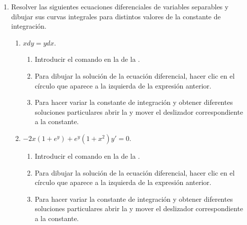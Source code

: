 \begin{enumerate}[leftmargin=*]
\item Resolver las siguientes ecuaciones diferenciales de variables separables y dibujar sus curvas integrales para distintos valores de la constante de integración.
      \begin{enumerate}
      \item $xdy=ydx$.
            \begin{indication}
            \begin{enumerate}
            \item Introducir el comando  en la  de la .
            \item Para dibujar la solución de la ecuación diferencial, hacer clic en el círculo que aparece a la izquierda de la expresión anterior.
            \item Para hacer variar la constante de integración y obtener diferentes soluciones particulares abrir la  y mover el deslizador correspondiente a la constante.
            \end{enumerate}
            \end{indication}

      \item $-2x(1+e^y)+e^y(1+x^{2})y'=0$.
            \begin{indication}
            \begin{enumerate}
            \item Introducir el comando  en la  de la .
            \item Para dibujar la solución de la ecuación diferencial, hacer clic en el círculo que aparece a la izquierda de la expresión anterior.
            \item Para hacer variar la constante de integración y obtener diferentes soluciones particulares abrir la  y mover el deslizador correspondiente a la constante.
            \end{enumerate}
            \end{indication}


\end{enumerate}
\end{enumerate}
